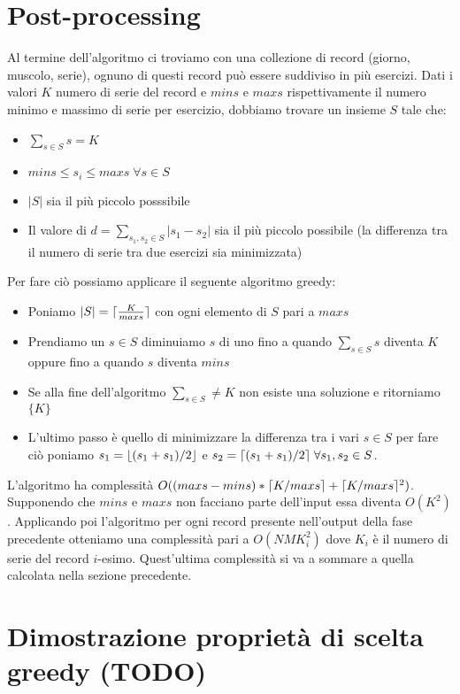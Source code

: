\documentclass{article}
\DeclarePairedDelimiter\ceil{\lceil}{\rceil}
\DeclarePairedDelimiter\floor{\lfloor}{\rfloor}
\begin{document}
\section{Post-processing}
Al termine dell'algoritmo ci troviamo con una collezione di record (giorno,
muscolo, serie), ognuno di questi record può essere suddiviso in più
esercizi. Dati i valori $K$ numero di serie del record e $mins$ e $maxs$
rispettivamente il numero minimo e massimo di serie per esercizio, dobbiamo
trovare un insieme $S$ tale che:
\begin{itemize}
    \item $\sum_{s \in S} s = K$
    \item $mins \leq s_i \leq maxs \; \forall s \in S$
    \item $|S|$ sia il più piccolo posssibile
    \item Il valore di $d = \sum_{s_1, s_2 \in S} |s_1 - s_2|$ sia il più
          piccolo possibile (la differenza tra il numero di serie tra due
          esercizi sia minimizzata)
\end{itemize}
Per fare ciò possiamo applicare il seguente algoritmo greedy:
\begin{itemize}
    \item Poniamo $|S| = \ceil{\frac{K}{maxs}}$ con ogni elemento di $S$
          pari a $maxs$
    \item Prendiamo un $s \in S$ diminuiamo $s$ di uno fino a quando
          $\sum_{s \in S} s$ diventa $K$ oppure fino a quando $s$ diventa $mins$
    \item Se alla fine dell'algoritmo $\sum_{s \in S} \neq K$ non esiste una
          soluzione e ritorniamo $\{ K \}$
    \item L'ultimo passo è quello di minimizzare la differenza tra i vari
          $s \in S$ per fare ciò poniamo $s_1 = \floor{(s_1 + s_1) / 2}$
          e $s_2 = \ceil{(s_1 + s_1) / 2} \; \forall s_1, s_2 \in S$.
\end{itemize}
L'algoritmo ha complessità
$O((maxs - mins) * \ceil{K / maxs} + \ceil{K / maxs}^2)$.
Supponendo che $mins$ e $maxs$ non facciano parte dell'input essa diventa
$O(K^2)$. Applicando poi l'algoritmo per ogni record presente nell'output
della fase precedente otteniamo una complessità pari a $O(NMK_i^2)$ dove $K_i$ è
il numero di serie del record $i$-esimo. Quest'ultima complessità si va
a sommare a quella calcolata nella sezione precedente.

\section{Dimostrazione proprietà di scelta greedy (TODO)}
\end{document}
